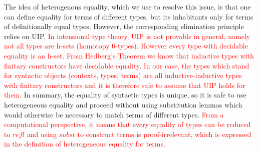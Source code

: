 \documentclass{acm_proc_article-sp}
\newcommand{\new}{\textcolor{red}}
\begin{document}
The idea of heterogenous equality, which we use to resolve this issue,
is that one can define equality for terms of different types, but its
inhabitants only for terms of definitionally equal types. However, the
corresponding elimination principle relies on UIP. \new{In intensional type theory, UIP is not provable in general,
  namely not all types are h-sets (homotopy 0-types). However every type with decidable equality is an h-set.
  From Hedberg's Theorem \cite{hed:98} we know that inductive
  types with finitary constructors have decidable equality. In our
  case, the types which stand for syntactic objects (contexts, types, terms)
  are all inductive-inductive types with finitary constructors and it is
  therefore safe to assume that UIP holds for them. }
In summary, the equality of
syntactic types is unique, so it is safe to use heterogeneous equality
and proceed without using substitution lemmas which would otherwise be
necessary to match terms of different types. \new{From a computational perspective, it means that every equality of types can be reduced to $\mathit{refl}$ and using $\mathit{subst}$ to construct terms is proof-irrelevant, which is expressed in the definition of heterogeneous equality for terms. }


\begin{code}%
\>  \AgdaSymbol{\{} \AgdaSymbol{:} \AgdaSymbol{\}\{} \AgdaSymbol{:}  \AgdaSymbol{\}} \AgdaSymbol{:}\<%
\\
\>[2]\<[9]%
\>[9]\AgdaSymbol{\{} \AgdaSymbol{:}  \AgdaSymbol{\}}         \<%
\\
\>[0]\<[2]%
\>[2] \AgdaSymbol{:} \AgdaSymbol{(} \AgdaSymbol{:}  \AgdaSymbol{)}    \<%
\end{code}
\end{document}
